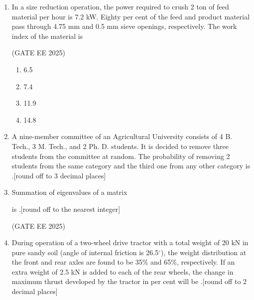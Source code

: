 \documentclass[journal,12pt,onecolumn]{IEEEtran}
\theoremstyle{remark}
\begin{document}
\begin{enumerate}
\hfill(GATE EE 2025)

\begin{multicols}{4}
\begin{enumerate}
\item 0.73
\item 0.81
\item 0.86
\item 0.93
\end{enumerate}
\end{multicols}

\item In a size reduction operation, the power required to crush 2 ton of feed material per hour is 7.2 kW. Eighty per cent of the feed and product material pass through 4.75 mm and 0.5 mm sieve openings, respectively. The work index of the material is

\hfill(GATE EE 2025)

\begin{multicols}{4}
\begin{enumerate}
\item 6.5
\item 7.4
\item 11.9
\item 14.8
\end{enumerate}
\end{multicols}

\item A nine-member committee of an Agricultural University consists of 4 B. Tech., 3 M. Tech., and 2 Ph. D. students. It is decided to remove three students from the committee at random. The probability of removing 2 students from the same category and the third one from any other category is \underline{\hspace{2cm}}.{[round off to 3 decimal places]}


\item Summation of eigenvalues of a matrix 

is \underline{\hspace{2cm}}.{[round off to the nearest integer]}

\hfill(GATE EE 2025)

\item During operation of a two-wheel drive tractor with a total weight of 20 kN in pure sandy soil (angle of internal friction is 26.5$^\circ$), the weight distribution at the front and rear axles are found to be 35\% and 65\%, respectively. If an extra weight of 2.5 kN is added to each of the rear wheels, the change in maximum thrust developed by the tractor in per cent will be \underline{\hspace{2cm}}.{[round off to 2 decimal places]}


\end{enumerate}
\end{document}
